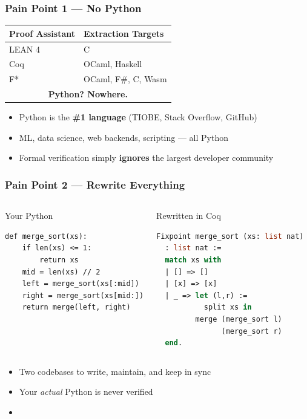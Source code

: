 \begin{frame}
\frametitle{Pain Point 1 --- No Python}
\begin{center}
\begin{tabular}{l l}
  \toprule
  \textbf{Proof Assistant} & \textbf{Extraction Targets} \\
  \midrule
  LEAN 4  & C \\
  Coq     & OCaml, Haskell \\
  F*      & OCaml, F\#, C, Wasm \\
  \midrule
  \multicolumn{2}{c}{\textcolor{jugeoRed}{\textbf{Python?  Nowhere.}}} \\
  \bottomrule
\end{tabular}
\end{center}
\vfill
\begin{itemize}
  \item Python is the \textbf{\#1 language} (TIOBE, Stack Overflow, GitHub)
  \item ML, data science, web backends, scripting --- all Python
  \item Formal verification simply \textbf{ignores} the largest developer community
\end{itemize}
\end{frame}

\begin{frame}[fragile]
\frametitle{Pain Point 2 --- Rewrite Everything}
\begin{columns}[T]
\begin{block}{Your Python}
\begin{lstlisting}
def merge_sort(xs):
    if len(xs) <= 1:
        return xs
    mid = len(xs) // 2
    left = merge_sort(xs[:mid])
    right = merge_sort(xs[mid:])
    return merge(left, right)
\end{lstlisting}
\end{block}
\begin{block}{Rewritten in Coq}
\begin{lstlisting}[language=ML,
  morekeywords={Fixpoint,match,with,end,
    Defined,Program,let,in}]
Fixpoint merge_sort (xs: list nat)
  : list nat :=
  match xs with
  | [] => []
  | [x] => [x]
  | _ => let (l,r) :=
           split xs in
         merge (merge_sort l)
               (merge_sort r)
  end.
\end{lstlisting}
\end{block}
\end{columns}
\vfill
\begin{itemize}
  \item Two codebases to write, maintain, and keep in sync
  \item Your \emph{actual} Python is never verified
  \item {}
\end{itemize}
\end{frame}

